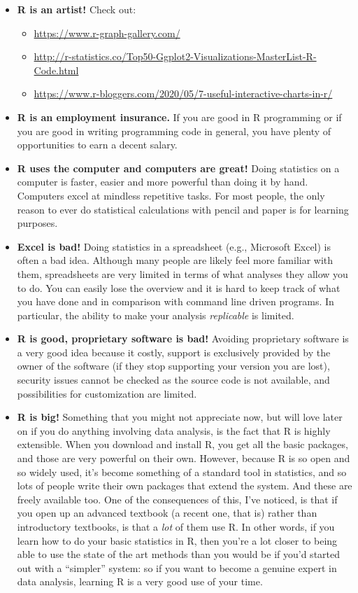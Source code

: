 \documentclass[
  12pt,
  oneside]{book}
\providecommand{\tightlist}{%
  \setlength{\itemsep}{0pt}\setlength{\parskip}{0pt}}
\begin{document}
\begin{itemize}
\tightlist
\item
  \textbf{R is an artist!} Check out:

  \begin{itemize}
  \tightlist
  \item
    \url{https://www.r-graph-gallery.com/}
  \item
    \url{http://r-statistics.co/Top50-Ggplot2-Visualizations-MasterList-R-Code.html}
  \item
    \url{https://www.r-bloggers.com/2020/05/7-useful-interactive-charts-in-r/}
  \end{itemize}
\item
  \textbf{R is an employment insurance.} If you are good in R programming or if you are good in writing programming code in general, you have plenty of opportunities to earn a decent salary.
\item
  \textbf{R uses the computer and computers are great!} Doing statistics on a computer is faster, easier and more powerful than doing it by hand. Computers excel at mindless repetitive tasks. For most people, the only reason to ever do statistical calculations with pencil and paper is for learning purposes.
\item
  \textbf{Excel is bad!} Doing statistics in a spreadsheet (e.g., Microsoft Excel) is often a bad idea. Although many people are likely feel more familiar with them, spreadsheets are very limited in terms of what analyses they allow you to do. You can easily lose the overview and it is hard to keep track of what you have done and in comparison with command line driven programs. In particular, the ability to make your analysis \emph{replicable} is limited.
\item
  \textbf{R is good, proprietary software is bad!} Avoiding proprietary software is a very good idea because it costly, support is exclusively provided by the owner of the software (if they stop supporting your version you are lost), security issues cannot be checked as the source code is not available, and possibilities for customization are limited.
\item
  \textbf{R is big!} Something that you might not appreciate now, but will love later on if you do anything involving data analysis, is the fact that R is highly extensible. When you download and install R, you get all the basic packages, and those are very powerful on their own. However, because R is so open and so widely used, it's become something of a standard tool in statistics, and so lots of people write their own packages that extend the system. And these are freely available too. One of the consequences of this, I've noticed, is that if you open up an advanced textbook (a recent one, that is) rather than introductory textbooks, is that a \emph{lot} of them use R. In other words, if you learn how to do your basic statistics in R, then you're a lot closer to being able to use the state of the art methods than you would be if you'd started out with a ``simpler'' system: so if you want to become a genuine expert in data analysis, learning R is a very good use of your time.

\end{itemize}
\end{document}
